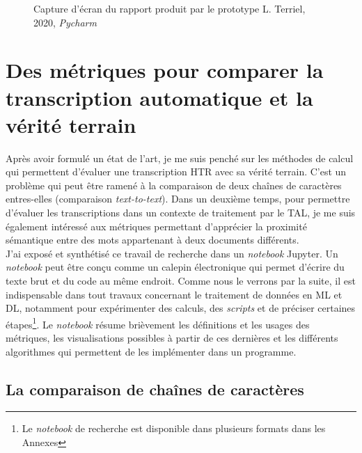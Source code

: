 \begin{figure}[h]
    \centering
    \centerline{}
    \caption{Capture d'écran du rapport produit par le prototype  \textcopyright L. Terriel, 2020, \textit{Pycharm}}
    \label{fig:cerwer}
\end{figure}

\newpage
\section{Des métriques pour comparer la transcription automatique et la vérité terrain}\label{metriques}

Après avoir formulé un état de l'art, je me suis penché sur les méthodes de calcul qui permettent d'évaluer une transcription HTR avec sa vérité terrain. C'est un problème qui peut être ramené à la comparaison de deux chaînes de caractères entres-elles (comparaison \textit{text-to-text}). Dans un deuxième temps, pour permettre d'évaluer les transcriptions dans un contexte de traitement par le TAL, je me suis également intéressé aux métriques permettant d'apprécier la proximité sémantique entre des mots appartenant à deux documents différents.\\

J'ai exposé et synthétisé ce travail de recherche dans un \textit{notebook} Jupyter. Un \textit{notebook} peut être conçu comme un calepin électronique qui permet d'écrire du texte brut et du code au même endroit. Comme nous le verrons par la suite, il est indispensable dans tout travaux concernant le traitement de données en ML et DL, notamment pour expérimenter des calculs, des \textit{scripts} et de préciser certaines étapes\footnote{Le \textit{notebook} de recherche est disponible dans plusieurs formats dans les Annexes  }. Le \textit{notebook} résume brièvement les définitions et les usages des métriques, les visualisations possibles à partir de ces dernières et les différents algorithmes qui permettent de les implémenter dans un programme.\\

\subsection{La comparaison de chaînes de caractères}

